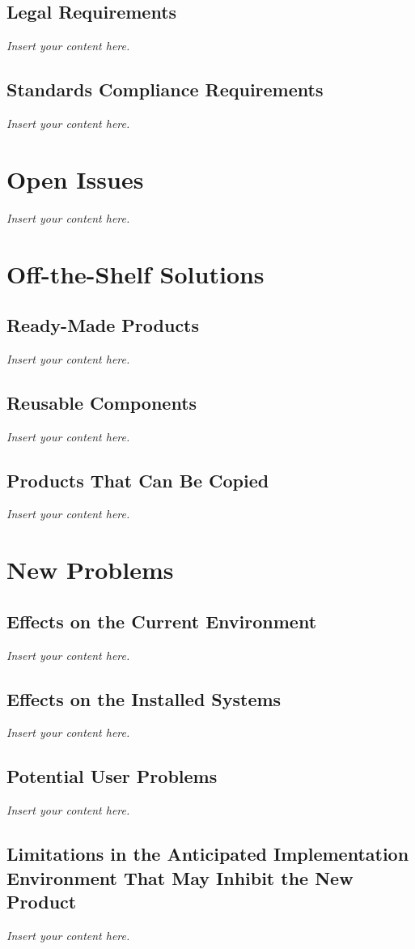 \documentclass[12pt]{article}
\newcommand{\lips}{\textit{Insert your content here.}}
\begin{document}
\subsection{Legal Requirements}
\lips
\subsection{Standards Compliance Requirements}
\lips

\section{Open Issues}
\lips
\section{Off-the-Shelf Solutions}
\subsection{Ready-Made Products}
\lips
\subsection{Reusable Components}
\lips
\subsection{Products That Can Be Copied}
\lips

\section{New Problems}
\subsection{Effects on the Current Environment}
\lips
\subsection{Effects on the Installed Systems}
\lips
\subsection{Potential User Problems}
\lips
\subsection{Limitations in the Anticipated Implementation Environment That May
Inhibit the New Product}
\lips
\end{document}
